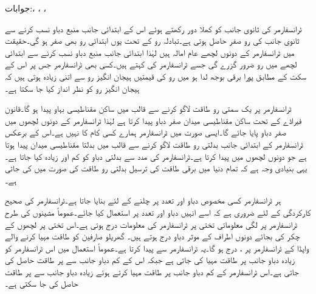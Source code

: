 جوابات:، ، ، 

ٹرانسفارمر کی ثانوی جانب کو کھلا دور رکھتے ہوئے اس کے ابتدائی جانب منبع دباو نسب کرنے سے ثانوی جانب کی رو صفر حاصل ہوتی ہے۔تبادلہ رو کے تحت یوں ابتدائی رو بھی صفر ہو گی۔حقیقت میں ٹرانسفارمر کے دونوں لچھے عام امالہ ہیں لہٰذا ابتدائی جانب منبع دباو نسب کرنے سے ابتدائی لچھے میں رو ضرور گزرے گی جسے ٹرانسفارمر کی  کہتے ہیں۔کسی بھی ٹرانسفارمر جس پر اس کے سکت کے مطابق پورا برقی بوجھ لدا ہو میں رو کی قیمتیں  ہیجان انگیز رو سے اتنی زیادہ ہوتی ہیں کہ ہیجان انگیز رو کو نظر انداز کیا جا سکتا ہے۔

ٹرانسفارمر پر یک سمتی رو طاقت لاگو کرنے سے قالب میں ساکن مقناطیسی بہاو پیدا ہو گا۔قانون فیراڈے کے تحت ساکن مقناطیسی میدان صفر دباو پیدا کرتا ہے لہٰذا ٹرانسفارمر کے دونوں لچھوں میں صفر دباو پایا جائے گا۔ایسی صورت میں ٹرانسفارمر ہمارے کسی کام کا نہیں ہے۔اس کے برعکس ٹرانسفارمر کے ابتدائی جانب بدلتی رو طاقت لاگو کرنے سے قالب میں بدلتا مقناطیسی میدان پیدا ہوتا ہے جو دونوں لچھوں میں   پیدا کرتا ہے۔ٹرانسفارمر کی مدد سے بدلتی دباو کو کم اور زیادہ کیا جاتا ہے۔یہی بنیادی وجہ ہے کہ تمام دنیا میں برقی طاقت کی ترسیل بدلتی رو طاقت کی صورت میں کی جاتی ہے۔

ہر ٹرانسفارمر کسی مخصوص دباو اور تعدد پر چلنے کے لئے بنایا جاتا ہے۔ٹرانسفارمر کی صحیح کارکردگی کے لئے ضروری ہے کہ اسے انہیں دباو اور تعدد پر استعمال کیا جائے۔عموماً مشینوں کی طرح ٹرانسفارمر پر لگی معلوماتی تختی پر ٹرانسفارمر کی معلومات درج ہوتی ہے۔اس تختی پر لچھوں کے چکر کی بجائے دونوں اطراف کے موثر دباو درج ہوتے ہیں۔ گھریلو صارفین کو طاقت مہیا کرنے والے واپڈا کے ٹرانسفارمر پر ،  درج ہو گا۔یہ ٹرانسفارمر  سے  پیدا کرتا ہے۔عموماً استعمال میں اس ٹرانسفارمر کو زیادہ دباو جانب  پر طاقت مہیا کی جاتی ہے  جبکہ اس کے کم دباو جانب سے  پر طاقت حاصل کی جاتی ہے۔اس ٹرانسفارمر کے کم دباو جانب  پر طاقت مہیا کرتے ہوئے زیادہ دباو جانب سے  پر طاقت حاصل کی جا سکتی ہے۔

